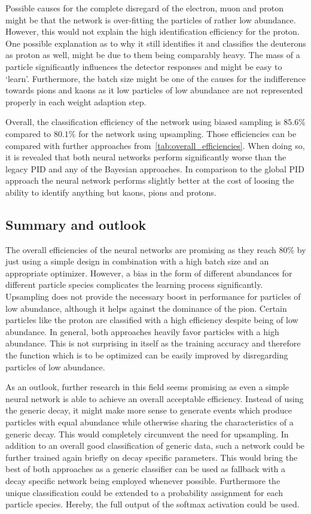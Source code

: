 Possible causes for the complete disregard of the electron, muon and proton might be that the network is over-fitting the particles of rather low abundance. However, this would not explain the high identification efficiency for the proton. One possible explanation as to why it still identifies it and classifies the deuterons as proton as well, might be due to them being comparably heavy. The mass of a particle significantly influences the detector responses and might be easy to `learn'.
Furthermore, the batch size might be one of the causes for the indifference towards pions and kaons as it low particles of low abundance are not represented properly in each weight adaption step.

Overall, the classification efficiency of the network using biased sampling is $85.6 \%$ compared to $80.1 \%$ for the network using upsampling. Those efficiencies can be compared with further approaches from~\autoref{tab:overall_efficiencies}. When doing so, it is revealed that both neural networks perform significantly worse than the legacy PID and any of the Bayesian approaches. In comparison to the global PID approach the neural network performs slightly better at the cost of loosing the ability to identify anything but kaons, pions and protons.

\subsection{Summary and outlook}
\label{subsc:neural_network_summary}

The overall efficiencies of the neural networks are promising as they reach $80 \%$ by just using a simple design in combination with a high batch size and an appropriate optimizer. However, a bias in the form of different abundances for different particle species complicates the learning process significantly. Upsampling does not provide the necessary boost in performance for particles of low abundance, although it helps against the dominance of the pion. Certain particles like the proton are classified with a high efficiency despite being of low abundance. In general, both approaches heavily favor particles with a high abundance. This is not surprising in itself as the training accuracy and therefore the function which is to be optimized can be easily improved by disregarding particles of low abundance.

As an outlook, further research in this field seems promising as even a simple neural network is able to achieve an overall acceptable efficiency. Instead of using the generic decay, it might make more sense to generate events which produce particles with equal abundance while otherwise sharing the characteristics of a generic decay. This would completely circumvent the need for upsampling. In addition to an overall good classification of generic data, such a network could be further trained again briefly on decay specific parameters. This would bring the best of both approaches as a generic classifier can be used as fallback with a decay specific network being employed whenever possible. Furthermore the unique classification could be extended to a probability assignment for each particle species. Hereby, the full output of the softmax activation could be used.
